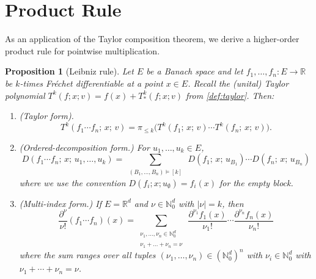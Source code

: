 \documentclass[10pt,a4paper]{article}
\theoremstyle{plain}
\newtheorem{proposition}[theorem]{Proposition}
\theoremstyle{definition}
\newcommand{\IR}{\mathbb{R}} %
\newcommand{\IN}{\mathbb{N}} %
\newcommand{\del}{\partial} %
\newcommand{\1}{\mathbb{1}} %
\newcommand{\ssum}[1]{\sum_{\substack{#1}}} %
\newcommand{\opart}{\models} %
\begin{document}
\section{Product Rule}\label{product-rule}

As an application of the Taylor composition theorem, we derive a
higher-order product rule for pointwise multiplication.

\begin{proposition}[Leibniz rule]

\label{prop:leibniz} Let \(E\) be a Banach space and let
\(f_1,\dots,f_n:E\to\IR\) be \(k\)-times Fréchet differentiable at a
point \(x \in E\). Recall the (unital) Taylor polynomial
\(T^k(f; x; v) = f(x) + T_{\ast}^k(f; x; v)\) from \ref{def:taylor}.
Then:

\begin{enumerate}
\def\labelenumi{\arabic{enumi}.}
\item
  (Taylor form). \[
     T^k(f_1 \cdots f_n;\, x;\, v) = \pi_{\leq k}\bigl(T^k(f_1;\, x;\, v) \cdots T^k(f_n;\, x;\, v)\bigr).
   \]
\item
  (Ordered-decomposition form.) For \(u_1,\dots,u_k\in E\), \[
  D(f_1 \cdots f_n;\, x;\, u_1,\dots,u_k)
  =
  \ssum{(B_1,\dots,B_n) \opart [k]}\ D(f_1;\, x;\, u_{B_1}) \cdots D(f_n;\, x;\, u_{B_n})
  \] where we use the convention \(D(f_i; x; u_\emptyset) = f_i(x)\) for
  the empty block.
\item
  (Multi-index form.) If \(E=\IR^d\) and \(\nu\in\IN_0^d\) with
  \(|\nu|=k\), then \[
  \frac{\del^\nu}{\nu!}(f_1 \cdots f_n)(x)
  =
  \ssum{\nu_1,\dots,\nu_n \in \IN_0^d \\\\ \nu_1 + \dots + \nu_n = \nu}\ \frac{\del^{\nu_1}f_1(x)}{\nu_1!} \cdots \frac{\del^{\nu_n}f_n(x)}{\nu_n!}
  \] where the sum ranges over all tuples
  \((\nu_1,\dots,\nu_n)\in(\IN_0^d)^n\) with \(\nu_i \in \IN_0^d\) with
  \(\nu_1+\cdots+\nu_n=\nu\).
\end{enumerate}

\end{proposition}
\end{document}
